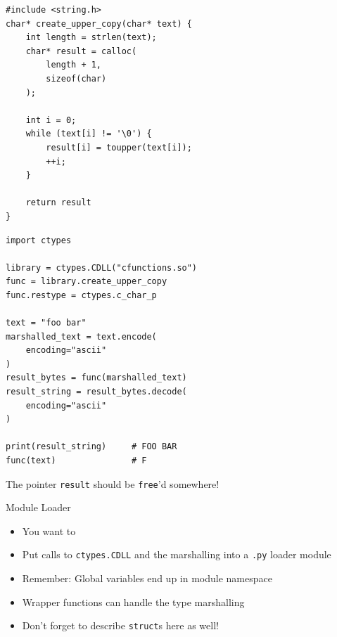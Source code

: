 \begin{frame}[fragile]
%
\begin{tcbraster}[raster columns=2,
                  raster equal height,
                  nobeforeafter,
                  raster column skip=0.2cm]
\begin{codebox}
\begin{verbatim}
#include <string.h>
char* create_upper_copy(char* text) {
    int length = strlen(text);
    char* result = calloc(
        length + 1,
        sizeof(char)
    );
    
    int i = 0;
    while (text[i] != '\0') {
        result[i] = toupper(text[i]);
        ++i;
    }
    
    return result
}
\end{verbatim}
\end{codebox}
%
\begin{codebox}
\begin{verbatim}
import ctypes

library = ctypes.CDLL("cfunctions.so")
func = library.create_upper_copy
func.restype = ctypes.c_char_p

text = "foo bar"
marshalled_text = text.encode(
    encoding="ascii"
)
result_bytes = func(marshalled_text)
result_string = result_bytes.decode(
    encoding="ascii"
)

print(result_string)     # FOO BAR
func(text)               # F
\end{verbatim}
\end{codebox}
\end{tcbraster}
%
\begin{warnbox}[]
\footnotesize
The pointer \texttt{result} should be \texttt{free}'d somewhere!
\end{warnbox}
%
\end{frame}


\begin{frame}{Module Loader}
%
\begin{itemize}
\item You want to 
\item[\Thus] Put calls to \texttt{ctypes.CDLL} and the marshalling into a \texttt{.py} loader module
\item Remember: Global variables end up in module namespace
\item Wrapper functions can handle the type marshalling
\item Don't forget to describe \texttt{struct}s here as well!
\end{itemize}
%
\end{frame}

